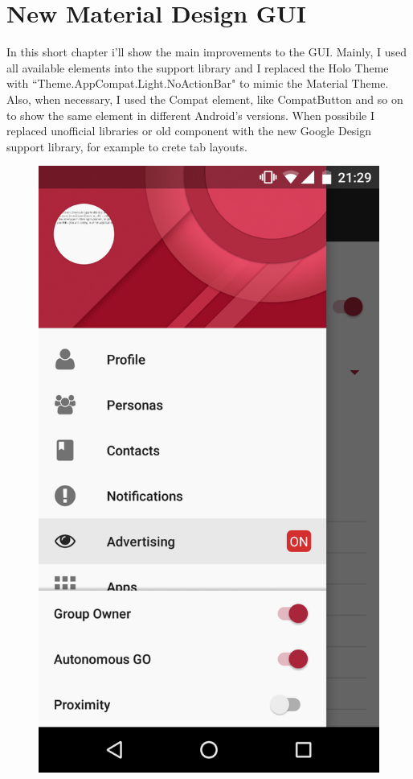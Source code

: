 \chapter{New Material Design GUI}
\label{gui}

In this short chapter i'll show the main improvements to the GUI.
Mainly, I used all available elements into the support library and I replaced the Holo Theme with ``Theme.AppCompat.Light.NoActionBar" to mimic the Material Theme. Also, when necessary, I used the Compat element, like CompatButton and so on to show the same element in different Android's versions. When possibile I replaced unofficial libraries or old component with the new Google Design support library, for example to crete tab layouts. 

\begin{figure}[thpb]
\centering
\begin{minipage}[b]{0.4\textwidth}
	\centering
	\includegraphics[scale=0.1]{./images/chap3/drawer.png}

\end{minipage}
\end{figure}
